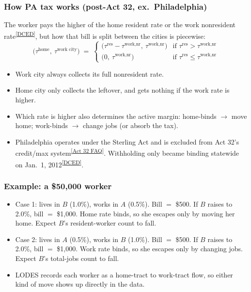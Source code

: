 \documentclass[xcolor = x11names, compress, aspectratio = 169]{beamer}
\newcommand{\src}[2]{\textsuperscript{\href{#1}{\footnotesize[#2]}}}
\begin{document}
\begin{frame}
\frametitle{How PA tax works (post-Act 32, ex.\ Philadelphia)}
    \small
    The worker pays the higher of the home resident rate or the work
    nonresident rate\src{https://dced.pa.gov/local-government/local-income-tax-information/local-withholding-tax-faqs/}{DCED}, but how that bill is split between the cities is
    piecewise:
    \[
        \bigl(\tau^{\text{home}},\ \tau^{\text{work city}}\bigr) \;=\;
        \begin{cases}
            \bigl(\tau^{\text{res}} - \tau^{\text{work,nr}},\ \tau^{\text{work,nr}}\bigr)
                & \text{if } \tau^{\text{res}} > \tau^{\text{work,nr}} \\[2pt]
            \bigl(0,\ \tau^{\text{work,nr}}\bigr)
                & \text{if } \tau^{\text{res}} \leq \tau^{\text{work,nr}}
        \end{cases}
    \]
    \begin{itemize}\setlength{\itemsep}{0.18cm}
        \item Work city always collects its full nonresident rate.
        \item Home city only collects the leftover, and gets nothing
        if the work rate is higher.
        \item Which rate is higher also determines the active margin:
        home-binds $\rightarrow$ move home; work-binds $\rightarrow$
        change jobs (or absorb the tax).
        \item Philadelphia operates under the Sterling Act and is
        excluded from Act 32's credit/max
        system\src{https://dced.pa.gov/local-government/local-income-tax-information/act32-faq/}{Act 32 FAQ}.
        Withholding only became binding statewide on
        Jan.\ 1, 2012\src{https://dced.pa.gov/local-government/local-income-tax-information/act32-faq/}{DCED}.
    \end{itemize}
\end{frame}

\begin{frame}
\frametitle{Example: a \$50{,}000 worker}
    \small
    \begin{itemize}\setlength{\itemsep}{0.18cm}
        \item Case 1: lives in $B$ (1.0\%), works in $A$ (0.5\%).
        Bill $=$ \$500. If $B$ raises to 2.0\%, bill $=$ \$1{,}000.
        Home rate binds, so she escapes only by moving her home.
        Expect $B$'s resident-worker count to fall.
        \item Case 2: lives in $A$ (0.5\%), works in $B$ (1.0\%).
        Bill $=$ \$500. If $B$ raises to 2.0\%, bill $=$ \$1{,}000.
        Work rate binds, so she escapes only by changing jobs.
        Expect $B$'s total-jobs count to fall.
        \item LODES records each worker as a home-tract to work-tract
        flow, so either kind of move shows up directly in the data.
    \end{itemize}
\end{frame}
\end{document}
